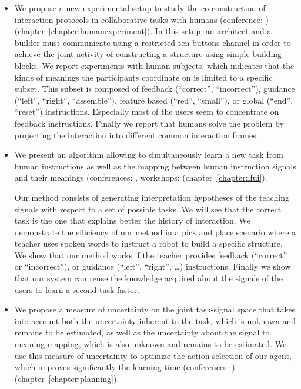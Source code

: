 \begin{itemize}

\item We propose a new experimental setup to study the co-construction of interaction protocols in collaborative tasks with humans (conference: \cite{vollmer2014studying}) (chapter~\ref{chapter:humanexperiment}). In this setup, an architect and a builder must communicate using a restricted ten buttons channel in order to achieve the joint activity of constructing a structure using simple building blocks. We report experiments with human subjects, which indicates that the kinds of meanings the participants coordinate on is limited to a specific subset. This subset is composed of feedback (``correct'', ``incorrect''), guidance (``left'', ``right'', ``assemble''), feature based (``red'', ``small''), or global (``end'', ``reset'') instructions. Especially most of the users seem to concentrate on feedback instructions. Finally we report that humans solve the problem by projecting the interaction into different common interaction frames.

\item  We present an algorithm allowing to simultaneously learn a new task from human instructions as well as the mapping between human instruction signals and their meanings (conferences: \cite{grizou2013robot,grizou2014calibration,grizou2014interactive}, workshops: \cite{grizou2013interactive,grizou2014robot} (chapter~\ref{chapter:lfui}). 

Our method consists of generating interpretation hypotheses of the teaching signals with respect to a set of possible tasks. We will see that the correct task is the one that explains better the history of interaction. We demonstrate the efficiency of our method in a pick and place scenario where a teacher uses spoken words to instruct a robot to build a specific structure. We show that our method works if the teacher provides feedback (``correct'' or ``incorrect''), or guidance (``left'', ``right'', \ldots) instructions. Finally we show that our system can reuse the knowledge acquired about the signals of the users to learn a second task faster.

\item We propose a measure of uncertainty on the joint task-signal space that takes into account both the uncertainty inherent to the task, which is unknown and remains to be estimated, as well as the uncertainty about the signal to meaning mapping, which is also unknown and remains to be estimated. We use this measure of uncertainty to optimize the action selection of our agent, which improves significantly the learning time (conferences: \cite{grizou2014calibration,grizou2014interactive}) (chapter~\ref{chapter:planning}).


\end{itemize}
